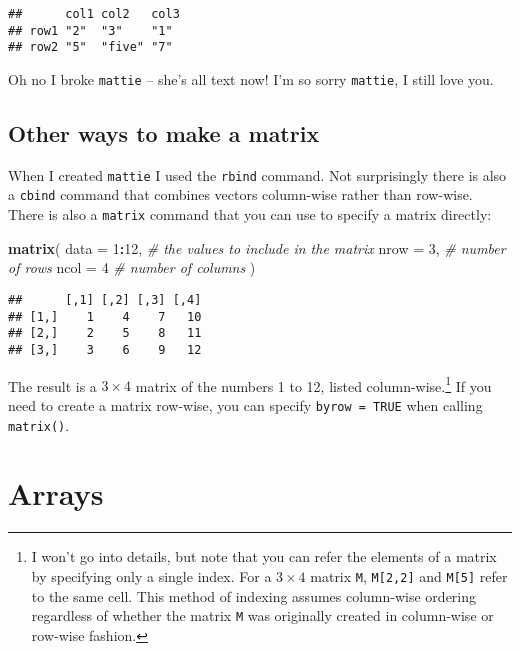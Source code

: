 \documentclass[]{book}
\newenvironment{Shaded}{\begin{snugshade}}{\end{snugshade}}
\newcommand{\CommentTok}[1]{\textcolor[rgb]{0.56,0.35,0.01}{\textit{#1}}}
\newcommand{\DataTypeTok}[1]{\textcolor[rgb]{0.13,0.29,0.53}{#1}}
\newcommand{\DecValTok}[1]{\textcolor[rgb]{0.00,0.00,0.81}{#1}}
\newcommand{\KeywordTok}[1]{\textcolor[rgb]{0.13,0.29,0.53}{\textbf{#1}}}
\newcommand{\NormalTok}[1]{#1}
\newcommand{\OperatorTok}[1]{\textcolor[rgb]{0.81,0.36,0.00}{\textbf{#1}}}
\let\rmarkdownfootnote\footnote%
\def\footnote{\protect\rmarkdownfootnote}
\begin{document}
\begin{verbatim}
##      col1 col2   col3
## row1 "2"  "3"    "1" 
## row2 "5"  "five" "7"
\end{verbatim}

Oh no I broke \texttt{mattie} -- she's all text now! I'm so sorry \texttt{mattie}, I still love you.

\hypertarget{other-ways-to-make-a-matrix}{%
\subsection{Other ways to make a matrix}\label{other-ways-to-make-a-matrix}}

When I created \texttt{mattie} I used the \texttt{rbind} command. Not surprisingly there is also a \texttt{cbind} command that combines vectors column-wise rather than row-wise. There is also a \texttt{matrix} command that you can use to specify a matrix directly:

\begin{Shaded}
\begin{Highlighting}[]
\KeywordTok{matrix}\NormalTok{(}
  \DataTypeTok{data =} \DecValTok{1}\OperatorTok{:}\DecValTok{12}\NormalTok{, }\CommentTok{# the values to include in the matrix}
  \DataTypeTok{nrow =} \DecValTok{3}\NormalTok{,    }\CommentTok{# number of rows}
  \DataTypeTok{ncol =} \DecValTok{4}     \CommentTok{# number of columns}
\NormalTok{)}
\end{Highlighting}
\end{Shaded}

\begin{verbatim}
##      [,1] [,2] [,3] [,4]
## [1,]    1    4    7   10
## [2,]    2    5    8   11
## [3,]    3    6    9   12
\end{verbatim}

The result is a \(3\times 4\) matrix of the numbers 1 to 12, listed column-wise.\footnote{I won't go into details, but note that you can refer the elements of a matrix by specifying only a single index. For a \(3\times 4\) matrix \texttt{M}, \texttt{M{[}2,2{]}} and \texttt{M{[}5{]}} refer to the same cell. This method of indexing assumes column-wise ordering regardless of whether the matrix \texttt{M} was originally created in column-wise or row-wise fashion.} If you need to create a matrix row-wise, you can specify \texttt{byrow\ =\ TRUE} when calling \texttt{matrix()}.

\hypertarget{arrays}{%
\section{Arrays}\label{arrays}}
\end{document}
